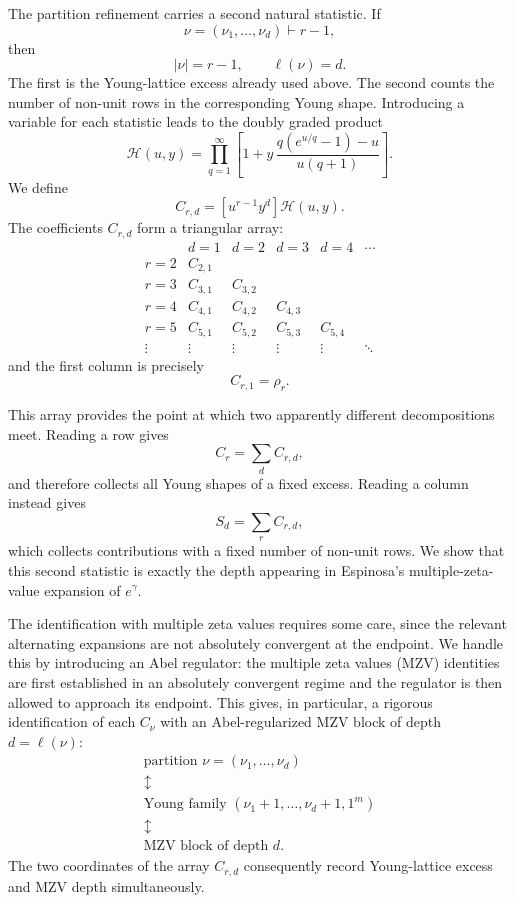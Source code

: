 \documentclass[11pt]{article}
\theoremstyle{definition}
\begin{document}
The partition refinement carries a second natural statistic.  If
\[
        \nu=(\nu_1,\ldots,\nu_d)\vdash r-1,
\]
then
\[
        |\nu|=r-1,
        \qquad
        \ell(\nu)=d.
\]
The first is the Young-lattice excess already used above.  The second
counts the number of non-unit rows in the corresponding Young shape.
Introducing a variable for each statistic leads to the doubly graded
product
\begin{equation}\label{eq:Hscr-intro}
 \mathscr H(u,y)
 =
 \prod_{q=1}^\infty
 \left[
 1+
 y\,\frac{q(e^{u/q}-1)-u}{u(q+1)}
 \right].
\end{equation}
We define
\[
        C_{r,d}
        =
        [u^{r-1}y^d]\mathscr H(u,y).
\]
The coefficients $C_{r,d}$ form a triangular array:
\[
\begin{array}{c|ccccc}
 & d=1 & d=2 & d=3 & d=4 & \cdots \\ \hline
 r=2 & C_{2,1} \\
 r=3 & C_{3,1} & C_{3,2} \\
 r=4 & C_{4,1} & C_{4,2} & C_{4,3} \\
 r=5 & C_{5,1} & C_{5,2} & C_{5,3} & C_{5,4}\\
 \vdots & \vdots & \vdots & \vdots & \vdots & \ddots
\end{array}
\]
and the first column is precisely
\[
        C_{r,1}=\rho_r.
\]

This array provides the point at which two apparently different
decompositions meet.  Reading a row gives
\[
        C_r=\sum_d C_{r,d},
\]
and therefore collects all Young shapes of a fixed excess.  Reading a
column instead gives
\[
        S_d=\sum_r C_{r,d},
\]
which collects contributions with a fixed number of non-unit rows.
We show that this second statistic is exactly the depth appearing in
Espinosa's multiple-zeta-value expansion of $e^\gamma$.

The identification with multiple zeta values requires some care,
since the relevant alternating expansions are not absolutely
convergent at the endpoint.  We handle this by introducing an Abel
regulator: the multiple zeta values (MZV) identities are first established in an absolutely
convergent regime and the regulator is then allowed to approach its
endpoint.  This gives, in particular, a rigorous identification of
each $C_\nu$ with an Abel-regularized MZV block of depth
$d=\ell(\nu)$:
\[
\boxed{
\begin{array}{c}
\text{partition }\nu = (\nu_1,\ldots , \nu_d)
\\[1mm]
\updownarrow\\[-1mm]
\text{Young family }
(\nu_1+1,\ldots,\nu_d+1,1^m)
\\[1mm]
\updownarrow\\[-1mm]
\text{MZV block of depth }d .
\end{array}}
\]
The two coordinates of the array $C_{r,d}$ consequently record
Young-lattice excess and MZV depth simultaneously.
\end{document}
